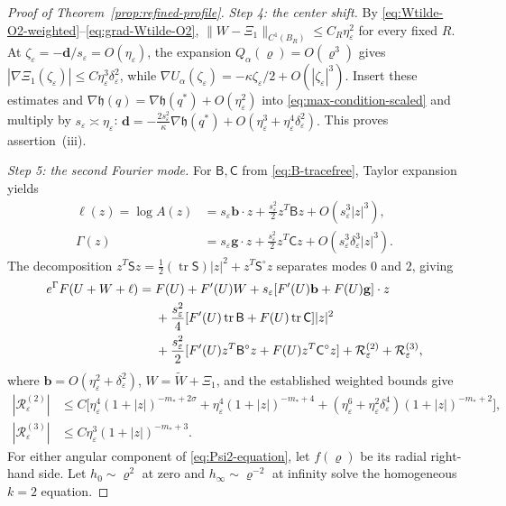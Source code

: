\documentclass[11pt,reqno]{amsart}
\numberwithin{equation}{section}
\theoremstyle{definition}
\theoremstyle{remark}
\newcommand{\eps}{\varepsilon}
\newcommand{\etae}{\eta_{\eps}}
\newcommand{\de}{\delta_{\eps}}
\newcommand{\tr}{\operatorname{tr}}
\begin{document}
\begin{proof}[Proof of Theorem~\ref{prop:refined-profile}]
\medskip\noindent
\emph{Step 4: the center shift.}
By \eqref{eq:Wtilde-O2-weighted}--\eqref{eq:grad-Wtilde-O2},
$\|W-\Xi_1\|_{C^1(B_R)}\le C_R\etae^2$ for every fixed $R$.
At $\zeta_\eps=-\mathbf d/s_\eps=O(\etae)$, the expansion
$Q_\alpha(\varrho)=O(\varrho^3)$ gives
$|\nabla\Xi_1(\zeta_\eps)|\le C\etae^3\de^2$, while
$\nabla U_\alpha(\zeta_\eps)=-\kappa\zeta_\eps/2+O(|\zeta_\eps|^3)$.
Insert these estimates and
$\nabla\mathfrak h(q)=\nabla\mathfrak h(q^*)+O(\etae^2)$
into \eqref{eq:max-condition-scaled} and multiply by $s_\eps\asymp\etae$:
\(
 \mathbf d=-\frac{2s_\eps^2}{\kappa}\nabla\mathfrak h(q^*)
             +O(\etae^3+\etae^4\de^2).
\)
This proves assertion~\textup{(iii)}.

\medskip
\noindent
\emph{Step 5: the second Fourier mode.}
For $\mathsf B,\mathsf C$ from \eqref{eq:B-tracefree}, Taylor expansion yields
\begin{align}
 \ell(z)=\log A(z)
 &=s_\eps \mathbf{b}\cdot z+\frac{s_\eps^2}{2}z^T\mathsf B z+O(s_\eps^3|z|^3),
 \label{eq:logA-second-correct}\\
 \Gamma(z)
 &=s_\eps \mathbf{g}\cdot z+\frac{s_\eps^2}{2}z^T\mathsf C z
   +O(s_\eps^3\de^3|z|^3).
 \label{eq:logGamma-second-correct}
\end{align}
The decomposition $z^T\mathsf S z=\tfrac12(\tr\mathsf S)|z|^2+z^T\mathsf S^\circ z$
separates modes $0$ and $2$, giving
\begin{align}
 e^\Gamma F(U+W+\ell)
 ={}&F(U)+F'(U)W+s_\eps[F'(U)\mathbf{b}+F(U)\mathbf{g}]\cdot z
 \notag\\
 &+\frac{s_\eps^2}{4}[F'(U)\tr\mathsf B+F(U)\tr\mathsf C]|z|^2
 \notag\\
 &+\frac{s_\eps^2}{2}[F'(U)z^T\mathsf B^\circ z+F(U)z^T\mathsf C^\circ z]
   +\mathcal R_\eps^{(2)}+\mathcal R_\eps^{(3)},
 \label{eq:full-second-order-expansion}
\end{align}
where $\mathbf{b}=O(\etae^2+\de^2)$, $W=\widetilde W+\Xi_1$, and the
established weighted bounds give
\begin{align}
 |\mathcal R_\eps^{(2)}|
 &\le C\big[\etae^4(1+|z|)^{-m_*+2\sigma}
       +\etae^4(1+|z|)^{-m_*+4}
 +(\etae^6+\etae^2\de^4)(1+|z|)^{-m_*+2}\big],
 \label{R1}\\
 |\mathcal R_\eps^{(3)}|
 &\le C\etae^3(1+|z|)^{-m_*+3}.
 \label{R2}
\end{align}
For either angular component of \eqref{eq:Psi2-equation}, let $f(\varrho)$
be its radial right-hand side. Let $h_0\sim\varrho^2$ at zero and
$h_\infty\sim\varrho^{-2}$ at infinity solve the homogeneous $k=2$ equation.

\end{proof}
\end{document}
